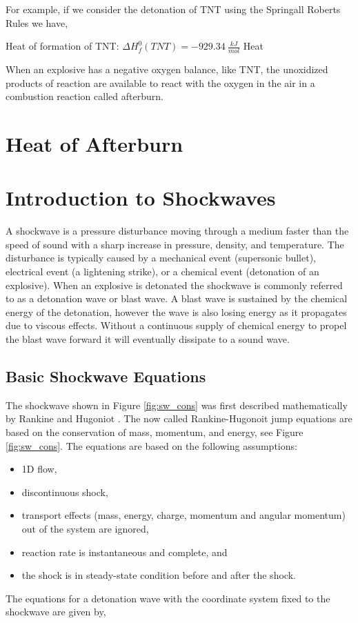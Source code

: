 For example, if we consider the detonation of TNT using the Springall Roberts Rules we have,

Heat of formation of TNT: $\Delta H^0_f(TNT) = -929.34\:\frac{kJ}{mol}$
Heat

When an explosive has a negative oxygen balance, like TNT, the unoxidized products of reaction are available to react with the oxygen in the air in a combustion reaction called afterburn.
\section{Heat of Afterburn}

\section{Introduction to Shockwaves}
A shockwave is a pressure disturbance moving through a medium faster than the speed of sound with a sharp increase in pressure, density, and temperature.  The disturbance is typically caused by a mechanical event (supersonic bullet), electrical event (a lightening strike), or a chemical event (detonation of an explosive).  When an explosive is detonated the shockwave is commonly referred to as a detonation wave or blast wave.  A blast wave is sustained by the chemical energy of the detonation, however the wave is also losing energy as it propagates due to viscous effects.  Without a continuous supply of  chemical energy to propel the blast wave forward it will eventually dissipate to a sound wave.

\subsection{Basic Shockwave Equations}
The shockwave shown in Figure \ref{fig:sw_cons} was first described mathematically by Rankine and Hugoniot \cite{Rankine1870}\cite{Hugoniot1889}\cite{johnson1998}.  The now called Rankine-Hugonoit jump equations are based on the conservation of mass, momentum, and energy, see Figure \ref{fig:sw_cons}.  The equations are based on the following assumptions:
\begin{itemize}
\item 1D flow,
\item discontinuous shock,
\item transport effects (mass, energy, charge, momentum and angular momentum) out of the system are ignored,
\item reaction rate is instantaneous and complete, and
\item the shock is in steady-state condition before and after the shock.
\end{itemize}
The equations for a detonation wave with the coordinate system fixed to the shockwave are given by,


